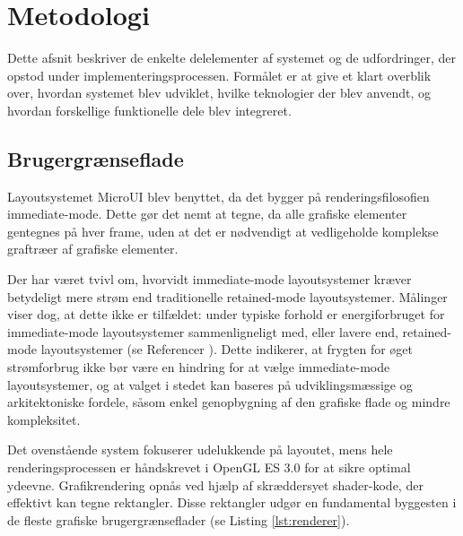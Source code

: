 \documentclass{article}
\begin{document}
\section{Metodologi}
Dette afsnit beskriver de enkelte delelementer af systemet og de udfordringer, 
der opstod under implementeringsprocessen. Formålet er at give et klart overblik 
over, hvordan systemet blev udviklet, hvilke teknologier der blev anvendt, og 
hvordan forskellige funktionelle dele blev integreret.

\subsection{Brugergrænseflade}
Layoutsystemet MicroUI blev benyttet, da det bygger på renderingsfilosofien
immediate-mode. Dette gør det nemt at tegne, da alle grafiske elementer
gentegnes på hver frame, uden at det er nødvendigt at vedligeholde komplekse
graftræer af grafiske elementer. 

Der har været tvivl om, hvorvidt immediate-mode layoutsystemer kræver 
betydeligt mere strøm end traditionelle retained-mode layoutsystemer. Målinger 
viser dog, at dette ikke er tilfældet: under typiske forhold er energiforbruget 
for immediate-mode layoutsystemer sammenligneligt med, eller lavere end,
retained-mode layoutsystemer (se Referencer \cite{smith2024_proving}).
Dette indikerer, at frygten for øget strømforbrug ikke bør være en hindring
for at vælge immediate-mode layoutsystemer, og at valget i stedet kan baseres på
udviklingsmæssige og arkitektoniske fordele, såsom enkel genopbygning af den
grafiske flade og mindre kompleksitet.

Det ovenstående system fokuserer udelukkende på layoutet,
mens hele renderingsprocessen er håndskrevet i OpenGL ES 3.0 for at sikre optimal ydeevne.
Grafikrendering opnås ved hjælp af skræddersyet shader-kode,
der effektivt kan tegne rektangler. Disse rektangler udgør en fundamental byggesten i de
fleste grafiske brugergrænseflader (se Listing \ref{lst:renderer}).
\end{document}
